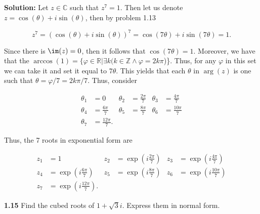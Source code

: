 \documentclass[12pt, a4paper]{article}
\begin{document}
\begin{description}
    \textbf{Solution: } Let $z\in\mathbb{C}$ such that $z^7=1$. Then let us denote $z=\cos(\theta)+i\sin(\theta)$, then by problem 1.13
    
    \begin{equation*}
        z^7 = (\cos(\theta)+i\sin(\theta))^7 = \cos(7\theta)+i\sin(7\theta) = 1.
    \end{equation*}
    
    \item Since there is $\im(z)=0$, then it follows that $\cos(7\theta)=1$. Moreover, we have that the $\arccos{(1)}=\{\varphi\in\mathbb{R}|\exists k(k\in\mathbb{Z}\wedge \varphi=2k\pi$)\}. Thus, for any $\varphi$ in this set we can take it and set it equal to $7\theta$. This yields that each $\theta$ in $\arg(z)$ is one such that $\theta=\varphi/7=2k\pi/7$. Thus, consider
    
    \begin{align*}
        \theta_1 &= 0 & \theta_2 &= \frac{2\pi}{7} & \theta_3 &= \frac{4\pi}{7} \\
        \theta_4 &= \frac{6\pi}{7} & \theta_5 &= \frac{8\pi}{7} & \theta_6 &= \frac{10\pi}{7} \\
        \theta_7 &= \frac{12\pi}{7}.
    \end{align*}
    
    \item Thus, the 7 roots in exponential form are
    
    \begin{align*}
        z_1 &= 1 & z_2 &= \exp{(i\frac{2\pi}{7})} & z_3 &= \exp{(i\frac{4\pi}{7})} \\
        z_4 &= \exp{(i\frac{6\pi}{7})} & z_5 &= \exp{(i\frac{8\pi}{7})} & z_6 &= \exp{(i\frac{10\pi}{7})} \\ z_7 &= \exp{(i\frac{12\pi}{7})}.
    \end{align*}

\end{description}

\noindent\textbf{1.15} Find the cubed roots of $1+\sqrt{3}i$. Express them in normal form.
\end{document}
